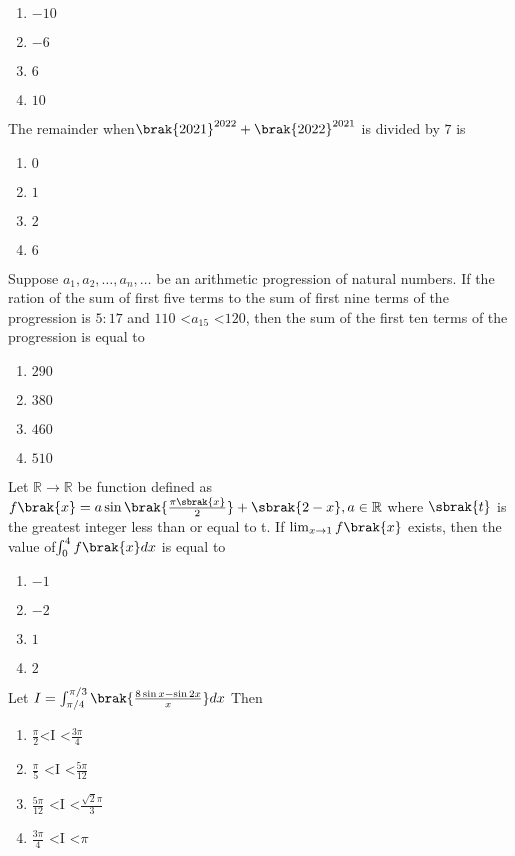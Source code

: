\hfill{}
		\begin{enumerate}
    \item $-10$
    \item $-6$
    \item $6$
    \item $10$
\end{enumerate}
\item The remainder when$\brak{2021}^{2022}+\brak{2022}^{2021}$ is divided by $7$ is
\hfill{}
	\begin{enumerate}
    \item $ 0$
    \item $1$
    \item $2$
    \item $6$
\end{enumerate}
\item Suppose $a_1, a_2, \dots, a_n, \dots$ be an arithmetic progression of natural numbers. If the ration of the sum of first five terms to the sum of first nine terms of the  progression is $5:17$ and $110$ \textless$ a_{15}$ \textless $120$, then the sum of the first ten terms of the progression is equal to
\hfill{}
	\begin{enumerate}
    \item $290$
    \item $380$
    \item $460$
    \item $510$
\end{enumerate}
\item Let $\mathbb {R} \rightarrow \mathbb {R}$ be function defined as
$f\brak{x}=a\sin \brak{\frac{\pi \sbrak{x}}{2}} + \sbrak{2-x}, a\in \mathbb{R}$ where $\sbrak{t}$ is the greatest integer less than or equal to t. If $ \lim_{ x \to 1}f\brak{x}$ exists, then the value of$ \int_{0}^{4}f\brak{x} dx $ is equal to
\hfill{}
		\begin{enumerate}
    \item $-1$
    \item $-2$
    \item $1$
    \item $2$
\end{enumerate}
\item  Let $I = \int_{\pi / 4}^{\pi /3}\brak{ \frac{8\sin x - \sin 2x}{x} }dx$ Then
\hfill{}
	\begin{enumerate}
    \item $ \frac{\pi}{2}$\textless I \textless $\frac{3\pi}{4}$
    \item $ \frac{\pi}{5}$ \textless I \textless $\frac{5\pi}{12}$
    \item $ \frac{5\pi}{12}$ \textless I \textless $\frac{\sqrt{2}\pi}{3}$
    \item $ \frac{3\pi}{4}$ \textless I \textless $\pi$
\end{enumerate}
